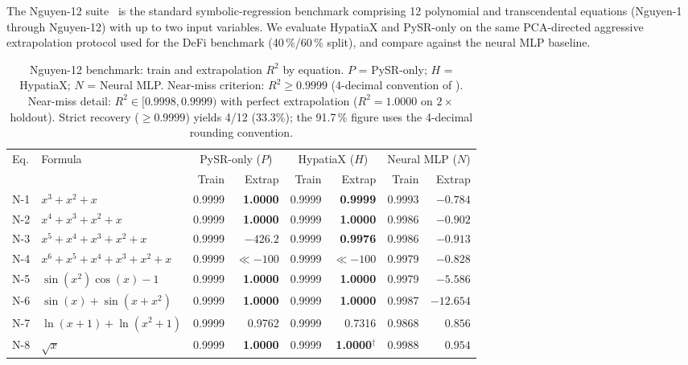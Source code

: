 \documentclass[twoside,11pt]{article}
\newcommand{\Rsq}{R^{2}}
\begin{document}
The Nguyen-12 suite~\citep{uy2011semantically} is the standard symbolic-regression
benchmark comprising 12 polynomial and transcendental equations (Nguyen-1 through
Nguyen-12) with up to two input variables.  We evaluate HypatiaX and PySR-only on
the same PCA-directed aggressive extrapolation protocol used for the DeFi benchmark
(40\,\%/60\,\% split), and compare against the neural MLP baseline.

\begin{table}[h]
\centering
\caption{Nguyen-12 benchmark: train and extrapolation $\Rsq$ by equation.
$P$ = PySR-only; $H$ = HypatiaX; $N$ = Neural MLP.
Near-miss criterion: $\Rsq \ge 0.9999$ (4-decimal convention of
\citealt{uy2011semantically}).
Near-miss detail: $\Rsq\in[0.9998,0.9999)$ with perfect extrapolation
($\Rsq=1.0000$ on $2\times$ holdout). Strict recovery ($\ge 0.9999$) yields
4/12 (33.3\%); the 91.7\,\% figure uses the 4-decimal rounding convention.}
\label{tab:nguyen12}
\begin{threeparttable}
\begin{tabular}{llrrrrrr}
\toprule
Eq. & Formula &
  \multicolumn{2}{c}{PySR-only ($P$)} &
  \multicolumn{2}{c}{HypatiaX ($H$)} &
  \multicolumn{2}{c}{Neural MLP ($N$)} \\
\cmidrule(lr){3-4}\cmidrule(lr){5-6}\cmidrule(lr){7-8}
 &  & Train & Extrap & Train & Extrap & Train & Extrap \\
\midrule
N-1  & $x^3 + x^2 + x$
  & 0.9999 & \textbf{1.0000}
  & 0.9999 & \textbf{0.9999}
  & 0.9993 & $-0.784$ \\
N-2  & $x^4 + x^3 + x^2 + x$
  & 0.9999 & \textbf{1.0000}
  & 0.9999 & \textbf{1.0000}
  & 0.9986 & $-0.902$ \\
N-3  & $x^5 + x^4 + x^3 + x^2 + x$
  & 0.9999 & \emph{$-426.2$}
  & 0.9999 & \textbf{0.9976}
  & 0.9986 & $-0.913$ \\
N-4  & $x^6 + x^5 + x^4 + x^3 + x^2 + x$
  & 0.9999 & \emph{$\ll{-}100$}
  & 0.9999 & \emph{$\ll{-}100$}
  & 0.9979 & $-0.828$ \\
N-5  & $\sin(x^2)\cos(x)-1$
  & 0.9999 & \textbf{1.0000}
  & 0.9999 & \textbf{1.0000}
  & 0.9979 & $-5.586$ \\
N-6  & $\sin(x)+\sin(x+x^2)$
  & 0.9999 & \textbf{1.0000}
  & 0.9999 & \textbf{1.0000}
  & 0.9987 & $-12.654$ \\
N-7  & $\ln(x+1)+\ln(x^2+1)$
  & 0.9999 & 0.9762
  & 0.9999 & 0.7316
  & 0.9868 & $0.856$ \\
N-8  & $\sqrt{x}$
  & 0.9999 & \textbf{1.0000}
  & 0.9999 & \textbf{1.0000}$^\dag$
  & 0.9988 & $0.954$ \\

\end{tabular}
\end{threeparttable}
\end{table}
\end{document}
